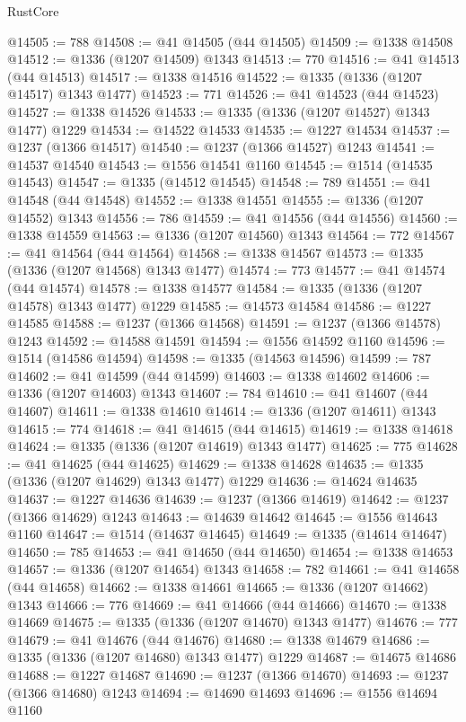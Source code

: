 \begin{lexlean}{RustCore}
\begin{coremodule}
@14505 := 788
@14508 := @41 @14505 (@44 @14505)
@14509 := @1338 @14508
@14512 := @1336 (@1207 @14509) @1343
@14513 := 770
@14516 := @41 @14513 (@44 @14513)
@14517 := @1338 @14516
@14522 := @1335 (@1336 (@1207 @14517) @1343 @1477)
@14523 := 771
@14526 := @41 @14523 (@44 @14523)
@14527 := @1338 @14526
@14533 := @1335 (@1336 (@1207 @14527) @1343 @1477) @1229
@14534 := @14522 @14533
@14535 := @1227 @14534
@14537 := @1237 (@1366 @14517)
@14540 := @1237 (@1366 @14527) @1243
@14541 := @14537 @14540
@14543 := @1556 @14541 @1160
@14545 := @1514 (@14535 @14543)
@14547 := @1335 (@14512 @14545)
@14548 := 789
@14551 := @41 @14548 (@44 @14548)
@14552 := @1338 @14551
@14555 := @1336 (@1207 @14552) @1343
@14556 := 786
@14559 := @41 @14556 (@44 @14556)
@14560 := @1338 @14559
@14563 := @1336 (@1207 @14560) @1343
@14564 := 772
@14567 := @41 @14564 (@44 @14564)
@14568 := @1338 @14567
@14573 := @1335 (@1336 (@1207 @14568) @1343 @1477)
@14574 := 773
@14577 := @41 @14574 (@44 @14574)
@14578 := @1338 @14577
@14584 := @1335 (@1336 (@1207 @14578) @1343 @1477) @1229
@14585 := @14573 @14584
@14586 := @1227 @14585
@14588 := @1237 (@1366 @14568)
@14591 := @1237 (@1366 @14578) @1243
@14592 := @14588 @14591
@14594 := @1556 @14592 @1160
@14596 := @1514 (@14586 @14594)
@14598 := @1335 (@14563 @14596)
@14599 := 787
@14602 := @41 @14599 (@44 @14599)
@14603 := @1338 @14602
@14606 := @1336 (@1207 @14603) @1343
@14607 := 784
@14610 := @41 @14607 (@44 @14607)
@14611 := @1338 @14610
@14614 := @1336 (@1207 @14611) @1343
@14615 := 774
@14618 := @41 @14615 (@44 @14615)
@14619 := @1338 @14618
@14624 := @1335 (@1336 (@1207 @14619) @1343 @1477)
@14625 := 775
@14628 := @41 @14625 (@44 @14625)
@14629 := @1338 @14628
@14635 := @1335 (@1336 (@1207 @14629) @1343 @1477) @1229
@14636 := @14624 @14635
@14637 := @1227 @14636
@14639 := @1237 (@1366 @14619)
@14642 := @1237 (@1366 @14629) @1243
@14643 := @14639 @14642
@14645 := @1556 @14643 @1160
@14647 := @1514 (@14637 @14645)
@14649 := @1335 (@14614 @14647)
@14650 := 785
@14653 := @41 @14650 (@44 @14650)
@14654 := @1338 @14653
@14657 := @1336 (@1207 @14654) @1343
@14658 := 782
@14661 := @41 @14658 (@44 @14658)
@14662 := @1338 @14661
@14665 := @1336 (@1207 @14662) @1343
@14666 := 776
@14669 := @41 @14666 (@44 @14666)
@14670 := @1338 @14669
@14675 := @1335 (@1336 (@1207 @14670) @1343 @1477)
@14676 := 777
@14679 := @41 @14676 (@44 @14676)
@14680 := @1338 @14679
@14686 := @1335 (@1336 (@1207 @14680) @1343 @1477) @1229
@14687 := @14675 @14686
@14688 := @1227 @14687
@14690 := @1237 (@1366 @14670)
@14693 := @1237 (@1366 @14680) @1243
@14694 := @14690 @14693
@14696 := @1556 @14694 @1160

\end{coremodule}
\end{lexlean}
